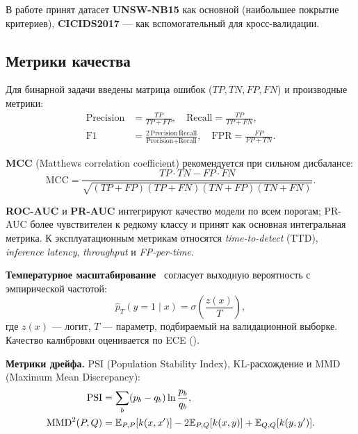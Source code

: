 В работе принят датасет \textbf{UNSW-NB15} как основной (наибольшее
покрытие критериев), \textbf{CICIDS2017} --- как вспомогательный для
кросс-валидации.

\subsection{Метрики качества}

Для бинарной задачи введены матрица ошибок (\(TP, TN, FP, FN\)) и
производные метрики:
\begin{align}
\text{Precision} &= \frac{TP}{TP + FP},
\quad
\text{Recall} = \frac{TP}{TP + FN},
\label{eq:pr}\\
\text{F1} &= \frac{2\,\text{Precision}\,\text{Recall}}
                 {\text{Precision} + \text{Recall}},
\quad
\text{FPR} = \frac{FP}{FP + TN}.\label{eq:f1}
\end{align}

\textbf{MCC} (Matthews correlation coefficient) рекомендуется при
сильном дисбалансе:
\begin{equation}
\text{MCC} =
\frac{TP \cdot TN - FP \cdot FN}
{\sqrt{(TP+FP)(TP+FN)(TN+FP)(TN+FN)}}.
\label{eq:mcc}
\end{equation}

\textbf{ROC-AUC} и \textbf{PR-AUC} интегрируют качество модели по всем
порогам; PR-AUC более чувствителен к редкому классу и принят как
основная интегральная метрика. К эксплуатационным метрикам относятся
\emph{time-to-detect} (TTD), \emph{inference latency}, \emph{throughput}
и \emph{FP-per-time}.

\textbf{Температурное масштабирование}~\cite{guo2017calibration}
согласует выходную вероятность с эмпирической частотой:
\begin{equation}
\hat{p}_{T}(y=1\mid x) = \sigma\!\left(\frac{z(x)}{T}\right),
\label{eq:temp-scaling}
\end{equation}
где \(z(x)\) --- логит, \(T\) --- параметр, подбираемый на
валидационной выборке. Качество калибровки оценивается по ECE
().

\textbf{Метрики дрейфа.} PSI (Population Stability Index),
KL-расхождение и MMD (Maximum Mean Discrepancy):
\begin{align}
\operatorname{PSI} &= \sum_{b}(p_b - q_b)\ln\frac{p_b}{q_b},
\label{eq:psi}\\
\operatorname{MMD}^{2}(P, Q) &= \mathbb{E}_{P,P}[k(x,x')] - 2\mathbb{E}_{P,Q}[k(x,y)]
                + \mathbb{E}_{Q,Q}[k(y,y')].\label{eq:mmd}
\end{align}

